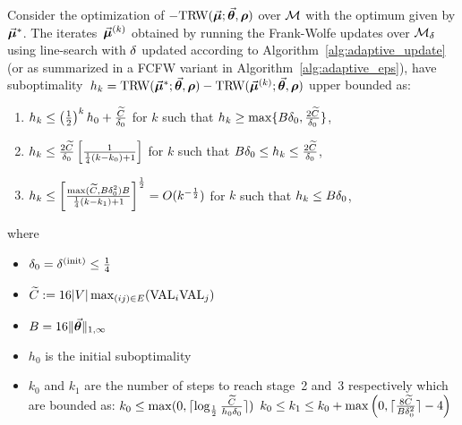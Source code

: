 \begin{lemma}
	\label{thm:convergence_adaptive_eps_trw}
	Consider the optimization of $-\text{TRW}(\vec{\bm{\mu}};\vec{\bm{\theta}},\bm{\rho})$ over $\mathcal{M}$ with the optimum given by $\vec{\bm{\mu}}^*$.
	The iterates~$\vec{\bm{\mu}}^{(k)}$ obtained by running the Frank-Wolfe updates over $\mathcal{M}_{\delta}$ using line-search with $\delta$ updated according to Algorithm~\ref{alg:adaptive_update} (or as summarized in a FCFW variant in Algorithm~\ref{alg:adaptive_eps}), have suboptimality~$h_k = \text{TRW}(\vec{\bm{\mu}}^{*};\vec{\bm{\theta}},\bm{\rho}) - \text{TRW}(\vec{\bm{\mu}}^{(k)};\vec{\bm{\theta}},\bm{\rho})$ upper bounded as:
	\begin{enumerate}
		\item $h_k\leq \left(\frac{1}{2}\right)^{k}h_{0} +\frac{\widetilde{C}}{\delta_0}$ for $k$ such that $h_k \geq \max\{ B\delta_0, \frac{2\widetilde{C}}{\delta_0}\}$, \\
		\item $h_k\leq\frac{2\widetilde{C}}{\delta_0}\left[\frac{1}{\frac{1}{4} (k-k_0)+1}\right]$ for $k$ such that $B\delta_0\leq h_k\leq\frac{2\widetilde{C}}{\delta_0}$,\\
		\item $h_k\leq \left[\frac{\max(\widetilde{C},B\delta_0^{2})B}{\frac{1}{4}(k-k_1)+1}\right]^{\frac{1}{2}} = O(k^{-\frac{1}{2}})$ for $k$ such that $h_k\leq B\delta_0$,\\
	\end{enumerate}
	where 

	\begin{itemize}

		\item $\delta_0 = \delta^{(\mathrm{init})} \leq \frac{1}{4}$ \\

		\item $\widetilde{C} := 16|V|\max_{(ij)\in E}(\textrm{VAL}_i\textrm{VAL}_j) $\\
	
		\item $B = 16 \|\vec{\bm{\theta}} \|_{1, \infty}$
	
		\item $h_0$ is the initial suboptimality\\

		\item	$k_0$ and $k_1$ are the number of steps to reach stage~2 and~3 respectively which are bounded as: $k_0\leq \max(0,  \lceil\log_{\frac{1}{2}}\frac{\widetilde{C}}{ h_0 \delta_0}\rceil )$ 
		$k_0 \leq k_1\leq k_0 + \max\left(0,\lceil \frac{8\widetilde{C}}{B\delta_0^{2}}\rceil -4\right)$\\
	\end{itemize}
\end{lemma}
